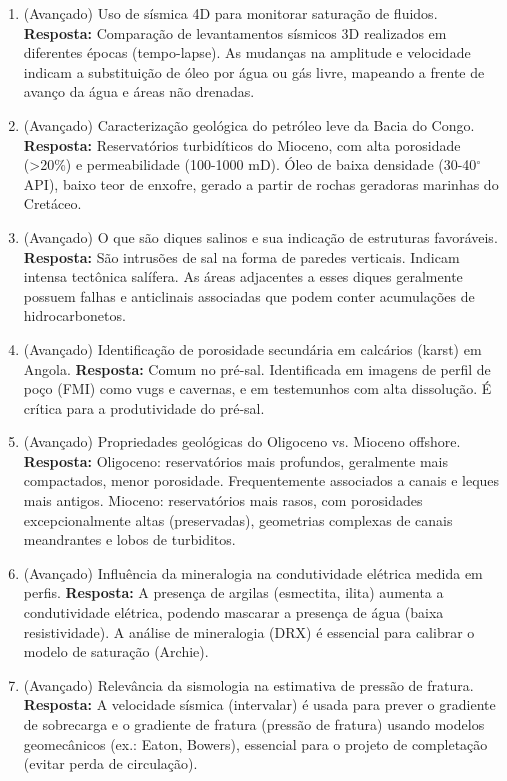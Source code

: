 \documentclass[11pt,a4paper]{article}
\begin{document}
\begin{enumerate}
  \item (Avançado) Uso de sísmica 4D para monitorar saturação de fluidos.
  \textbf{Resposta:} Comparação de levantamentos sísmicos 3D realizados em diferentes épocas (tempo-lapse). As mudanças na amplitude e velocidade indicam a substituição de óleo por água ou gás livre, mapeando a frente de avanço da água e áreas não drenadas.

  \item (Avançado) Caracterização geológica do petróleo leve da Bacia do Congo.
  \textbf{Resposta:} Reservatórios turbidíticos do Mioceno, com alta porosidade (>20\%) e permeabilidade (100-1000 mD). Óleo de baixa densidade (30-40$^\circ$ API), baixo teor de enxofre, gerado a partir de rochas geradoras marinhas do Cretáceo.

  \item (Avançado) O que são diques salinos e sua indicação de estruturas favoráveis.
  \textbf{Resposta:} São intrusões de sal na forma de paredes verticais. Indicam intensa tectônica salífera. As áreas adjacentes a esses diques geralmente possuem falhas e anticlinais associadas que podem conter acumulações de hidrocarbonetos.

  \item (Avançado) Identificação de porosidade secundária em calcários (karst) em Angola.
  \textbf{Resposta:} Comum no pré-sal. Identificada em imagens de perfil de poço (FMI) como vugs e cavernas, e em testemunhos com alta dissolução. É crítica para a produtividade do pré-sal.

  \item (Avançado) Propriedades geológicas do Oligoceno vs. Mioceno offshore.
  \textbf{Resposta:} Oligoceno: reservatórios mais profundos, geralmente mais compactados, menor porosidade. Frequentemente associados a canais e leques mais antigos. Mioceno: reservatórios mais rasos, com porosidades excepcionalmente altas (preservadas), geometrias complexas de canais meandrantes e lobos de turbiditos.

  \item (Avançado) Influência da mineralogia na condutividade elétrica medida em perfis.
  \textbf{Resposta:} A presença de argilas (esmectita, ilita) aumenta a condutividade elétrica, podendo mascarar a presença de água (baixa resistividade). A análise de mineralogia (DRX) é essencial para calibrar o modelo de saturação (Archie).

  \item (Avançado) Relevância da sismologia na estimativa de pressão de fratura.
  \textbf{Resposta:} A velocidade sísmica (intervalar) é usada para prever o gradiente de sobrecarga e o gradiente de fratura (pressão de fratura) usando modelos geomecânicos (ex.: Eaton, Bowers), essencial para o projeto de completação (evitar perda de circulação).


\end{enumerate}
\end{document}
